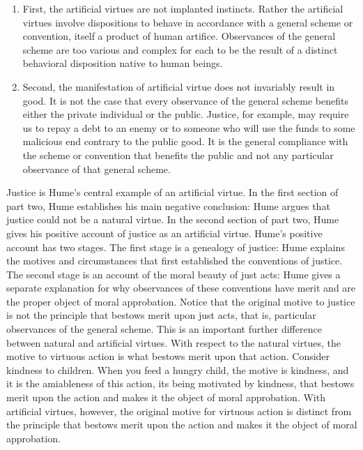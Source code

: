 \begin{enumerate}
	\item First, the artificial virtues are not implanted instincts. Rather the artificial virtues involve dispositions to behave in accordance with a general scheme or convention, itself a product of human artifice. Observances of the general scheme are too various and complex for each to be the result of a distinct behavioral disposition native to human beings.
    \item Second, the manifestation of artificial virtue does not invariably result in good. It is not the case that every observance of the general scheme benefits either the private individual or the public. Justice, for example, may require us to repay a debt to an enemy or to someone who will use the funds to some malicious end contrary to the public good. It is the general compliance with the scheme or convention that benefits the public and not any particular observance of that general scheme.
\end{enumerate}

Justice is Hume's central example of an artificial virtue. In the first section of part two, Hume establishes his main negative conclusion: Hume argues that justice could not be a natural virtue. In the second section of part two, Hume gives his positive account of justice as an artificial virtue.
Hume's positive account has two stages. The first stage is a genealogy of justice: Hume explains the motives and circumstances that first established the conventions of justice. The second stage is an account of the moral beauty of just acts: Hume gives a separate explanation for why observances of these conventions have merit and are the proper object of moral approbation. Notice that the original motive to justice is not the principle that bestows merit upon just acts, that is, particular observances of the general scheme.
This is an important further difference between natural and artificial virtues. With respect to the natural virtues, the motive to virtuous action is what bestows merit upon that action. Consider kindness to children. When you feed a hungry child, the motive is kindness, and it is the amiableness of this action, its being motivated by kindness, that bestows merit upon the action and makes it the object of moral approbation. With artificial virtues, however, the original motive for virtuous action is distinct from the principle that bestows merit upon the action and makes it the object of moral approbation.

% 

